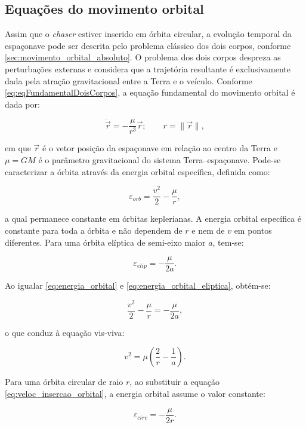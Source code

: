 \subsection{Equações do movimento orbital}
Assim que o \emph{chaser} estiver inserido em órbita circular, a evolução temporal da espaçonave pode ser descrita pelo problema clássico dos dois corpos, conforme \eqref{sec:movimento_orbital_absoluto}.
O problema dos dois corpos despreza as perturbações externas e considera que a trajetória resultante é exclusivamente dada pela atração gravitacional entre a Terra e o veículo.
Conforme \eqref{eq:eqFundamentalDoisCorpos}, a equação fundamental do movimento orbital é dada por:

\begin{equation}
\ddot {\vec r} = -\frac{\mu}{r^3}\vec r;
\qquad
r = \|\vec r\|,
\end{equation}

em que $\vec{r}$ é o vetor posição da espaçonave em relação ao centro da Terra e $\mu = GM$ é o parâmetro gravitacional do sistema Terra--espaçonave. 
Pode-se caracterizar a órbita através da energia orbital específica, definida como:

\begin{equation}
    \label{eq:energia_orbital}
\varepsilon_{orb} = \frac{v^{2}}{2} - \frac{\mu}{r},
\end{equation}

a qual permanece constante em órbitas keplerianas.
A energia orbital específica é constante para toda a órbita e não dependem de $r$ e nem de $v$ em pontos diferentes.  
Para uma órbita elíptica de semi-eixo maior $a$, tem-se:

\begin{equation}
    \label{eq:energia_orbital_eliptica}
\varepsilon_{elip} = -\frac{\mu}{2a}.
\end{equation}

Ao igualar \eqref{eq:energia_orbital} e \eqref{eq:energia_orbital_eliptica}, obtém-se:

\begin{equation}
\frac{v^{2}}{2} - \frac{\mu}{r} = -\frac{\mu}{2a},
\end{equation}

o que conduz à equação vis-viva:

\begin{equation}
    \label{eq:vis_viva}
v^{2} = \mu \left(\frac{2}{r} - \frac{1}{a}\right).
\end{equation}

Para uma órbita circular de raio $r$, ao substituir a equação
\eqref{eq:veloc_insercao_orbital}, a energia orbital assume o valor constante:

\begin{equation}
\varepsilon_{circ} = -\frac{\mu}{2r}.
\end{equation}

